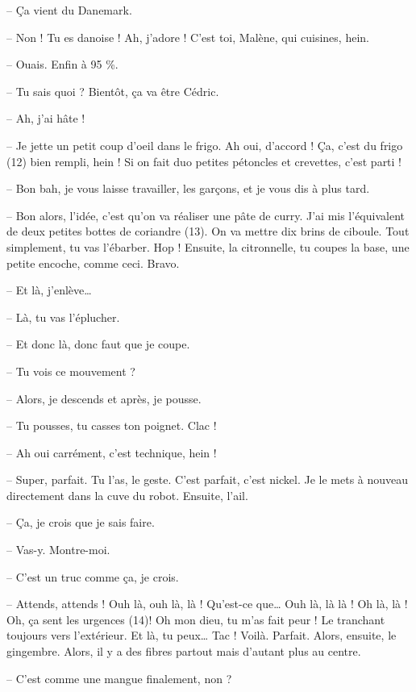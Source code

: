\documentclass[11pt, french]{report}
\begin{document}
-- Ça vient du Danemark.

-- Non ! Tu es danoise ! Ah, j’adore ! C’est toi, Malène, qui cuisines, hein.

-- Ouais. Enfin à 95 \%.

-- Tu sais quoi ? Bientôt, ça va être Cédric.

-- Ah, j’ai hâte !

-- Je jette un petit coup d’oeil dans le frigo. Ah oui, d’accord ! Ça, c’est
du frigo (12) bien rempli, hein ! Si on fait duo petites pétoncles et crevettes,
c’est parti !

-- Bon bah, je vous laisse travailler, les garçons, et je vous dis à plus tard.

-- Bon alors, l’idée, c’est qu’on va réaliser une pâte de curry. J’ai mis
l’équivalent de deux petites bottes de coriandre (13). On va mettre dix brins
de ciboule. Tout simplement, tu vas l’ébarber. Hop ! Ensuite, la citronnelle,
tu coupes la base, une petite encoche, comme ceci. Bravo.

-- Et là, j’enlève…

-- Là, tu vas l’éplucher.

-- Et donc là, donc faut que je coupe.

-- Tu vois ce mouvement ?

-- Alors, je descends et après, je pousse.

-- Tu pousses, tu casses ton poignet. Clac !

-- Ah oui carrément, c’est technique, hein !

-- Super, parfait. Tu l’as, le geste. C’est parfait, c’est nickel. Je le mets
à nouveau directement dans la cuve du robot. Ensuite, l’ail.

-- Ça, je crois que je sais faire.

-- Vas-y. Montre-moi.

-- C’est un truc comme ça, je crois.

-- Attends, attends ! Ouh là, ouh là, là ! Qu’est-ce que… Ouh là, là là !
Oh là, là ! Oh, ça sent les urgences (14)! Oh mon dieu, tu m’as fait peur !
Le tranchant toujours vers l’extérieur. Et là, tu peux… Tac ! Voilà. Parfait.
Alors, ensuite, le gingembre. Alors, il y a des fibres partout mais d’autant
plus au centre.

-- C’est comme une mangue finalement, non ?
\end{document}
